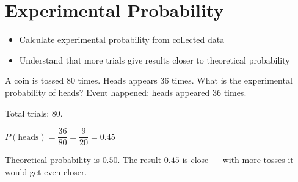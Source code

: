 \section{Experimental Probability}

\begin{stepGoal}
\begin{itemize}
    \item Calculate experimental probability from collected data
    \item Understand that more trials give results closer to theoretical probability
\end{itemize}
\end{stepGoal}

\begin{stepVocabBox}
\end{stepVocabBox}

\begin{stepsCard}
\end{stepsCard}

\begin{stepExample}{A coin is tossed $80$ times. Heads appears $36$ times. What is the experimental probability of heads?}
     Event happened: heads appeared $36$ times.

     Total trials: $80$.

     $P(\text{heads}) = \dfrac{36}{80} = \dfrac{9}{20} = 0.45$

     Theoretical probability is $0.50$. The result $0.45$ is close --- with more tosses it would get even closer.
\end{stepExample}

